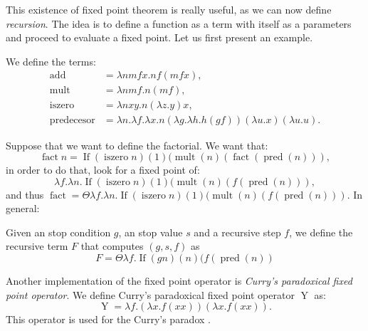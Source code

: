 This existence of fixed point theorem is really useful, as we can now define \emph{recursion}. The idea is to define a function as a term with itself as a parameters and proceed to evaluate a fixed point. Let us first present an example.

\begin{definition}
  We define the terms:
  \begin{align*}
    \operatorname{add} &= \lambda nm f x.nf (mf x),\\
    \operatorname{mult} &= \lambda nm f.n(mf),\\
    \operatorname{iszero} &= \lambda nxy.n(\lambda z.y)x,\\
    \operatorname{predecesor} &=\lambda n.\lambda f.\lambda x. n (\lambda g.\lambda h. h (g f)) (\lambda u.x) (\lambda u.u). 
  \end{align*}
  
\end{definition}
Suppose that we want to define the factorial. We want that:
$$\operatorname{fact} n = \operatorname{If}(\operatorname{iszero} n)(1)(\operatorname{mult}(n)(\operatorname{fact} (\operatorname{pred}(n))),$$
in order to do that, look for a fixed point of:
$$\lambda f. \lambda n.\operatorname{If}(\operatorname{iszero}n)(1)(\operatorname{mult}(n)(f (\operatorname{pred}(n))),$$
and thus $\operatorname{fact}=\Theta \lambda f.\lambda n. \operatorname{If}(\operatorname{iszero}n)(1)(\operatorname{mult}(n)(f (\operatorname{pred}(n)))$. In general:

\begin{definition}
  Given an stop condition $g$, an stop value $s$ and a recursive step $f$, we define the recursive term $F$ that computes $(g,s,f)$ as
  $$F = \Theta \lambda f. \operatorname{If}(gn)(n)(f (\operatorname{pred}(n))$$
\end{definition}

\begin{remark}
Another implementation of the fixed point operator is \emph{Curry's paradoxical fixed point operator}.  We define Curry's paradoxical fixed point operator $\operatorname{Y}$ as:
  $$\operatorname{Y}=\lambda f.(\lambda x.f(x x)) (\lambda x.f(x x)).$$
This operator is used for the Curry's paradox \cite{sep-curry-paradox}.\\
\end{remark}




